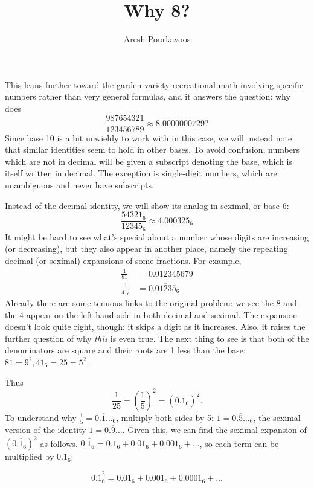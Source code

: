 \documentclass{article}
\begin{document}
\title{Why 8?}
\author{Aresh Pourkavoos}
\maketitle

This leans further toward the garden-variety recreational math
involving specific numbers rather than very general formulas,
and it answers the question: why does
\[\frac{987654321}{123456789} \approx 8.0000000729?\]
Since base 10 is a bit unwieldy to work with in this case,
we will instead note that similar identities seem to hold in other bases.
To avoid confusion, numbers which are not in decimal
will be given a subscript denoting the base,
which is itself written in decimal.
The exception is single-digit numbers, which are unambiguous
and never have subscripts.

Instead of the decimal identity,
we will show its analog in seximal, or base 6:
\[\frac{54321_6}{12345_6} \approx 4.000325_6\]
It might be hard to see what's special
about a number whose digits are increasing (or decreasing),
but they also appear in another place,
namely the repeating decimal (or seximal) expansions of some fractions.
For example,
\begin{align*}
  \frac{1}{81} &= 0.\overline{012345679} \\
  \frac{1}{41_6} &= 0.\overline{01235}_6
\end{align*}
Already there are some tenuous links to the original problem:
we see the 8 and the 4 appear on the left-hand side
in both decimal and seximal.
The expansion doesn't look quite right, though:
it skips a digit as it increases.
Also, it raises the further question
of why \textit{this} is even true.
The next thing to see is that both of the denominators are square
and their roots are 1 less than the base:
$81=9^2, 41_6=25=5^2$.

Thus
\[\frac{1}{25}=\left(\frac{1}{5}\right)^2=(0.\overline{1}_6)^2.\]
To understand why $\frac{1}{5}=0.\overline{1}\ldots_6$,
multiply both sides by 5:
$1=0.\overline{5}\ldots_6$,
the seximal version of the identity $1=0.\overline{9}\ldots$.
Given this, we can find the seximal expansion of $(0.\overline{1}_6)^2$
as follows.
$0.\overline{1}_6=0.1_6+0.01_6+0.001_6+\ldots$,
so each term can be multiplied by $0.\overline{1}_6$:

\[0.\overline{1}_6^2 = 0.0\overline{1}_6+0.00\overline{1}_6+0.000\overline{1}_6+\ldots\]
\end{document}
